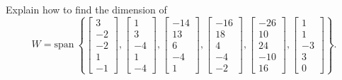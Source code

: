 \documentclass{article}
\begin{document}
\begin{exerciseStatement}
    Explain how to find the dimension of
\[W=\mathrm{span}\ \left\{\left[\begin{array}{r}
3 \\
-2 \\
-2 \\
1 \\
-1
\end{array}\right] , \left[\begin{array}{r}
1 \\
3 \\
-4 \\
1 \\
-4
\end{array}\right] , \left[\begin{array}{r}
-14 \\
13 \\
6 \\
-4 \\
1
\end{array}\right] , \left[\begin{array}{r}
-16 \\
18 \\
4 \\
-4 \\
-2
\end{array}\right] , \left[\begin{array}{r}
-26 \\
10 \\
24 \\
-10 \\
16
\end{array}\right] , \left[\begin{array}{r}
1 \\
1 \\
-3 \\
3 \\
0
\end{array}\right]\right\}.\]



  
\end{exerciseStatement}
\end{document}
